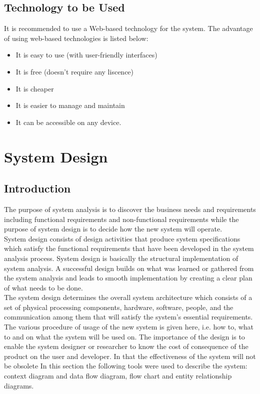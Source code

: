 \documentclass[twoside, a4paper, 12pt]{report}
\begin{document}
\section{Technology to be Used}
It is recommended to use a Web-based technology for the system. The advantage of using web-based technologies is listed below:
\begin{itemize}
	\item It is easy to use (with user-friendly interfaces)
	\item It is free (doesn't require any liscence)
	\item It is cheaper
	\item It is easier to manage and maintain
	\item It can be accessible on any device.
\end{itemize}

\chapter{System Design}
\section{Introduction}
The purpose of system analysis is to discover the business needs and requirements including functional requirements and non-functional requirements while the purpose of system design is to decide how the new system will operate.\\
\indent
System design consists of design activities that produce system specifications which satisfy the functional requirements that have been developed in the system analysis process. System design is basically the structural implementation of system analysis. A successful design builds on what was learned or gathered from the system analysis and leads to smooth implementation by creating a clear plan of what needs to be done.\\
\indent
The system design determines the overall system architecture which consists of a set of physical processing components, hardware, software, people, and the communication among them that will satisfy the system's essential requirements. The various procedure of usage of the new system is given here, i.e. how to, what to and on what the system will be used on. The importance of the design is to enable the system designer or researcher to know the cost of consequence of the product on the user and developer. In that the effectiveness of the system will not be obsolete %
\indent
In this section the following tools were used to describe the system: context diagram and data flow diagram, flow chart and entity relationship diagrams.
\end{document}
